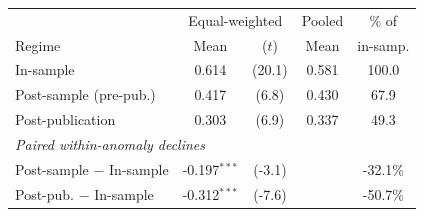 \begin{tabular}{lcccc}
\toprule
 & \multicolumn{2}{c}{Equal-weighted} & Pooled & \% of \\
Regime & Mean & ($t$) & Mean & in-samp. \\
\midrule
In-sample & 0.614 & (20.1) & 0.581 & 100.0 \\
Post-sample (pre-pub.) & 0.417 & (6.8) & 0.430 & 67.9 \\
Post-publication & 0.303 & (6.9) & 0.337 & 49.3 \\
\midrule
\multicolumn{5}{l}{\textit{Paired within-anomaly declines}}\\
Post-sample $-$ In-sample & -0.197$^{***}$ & (-3.1) & & -32.1\% \\
Post-pub. $-$ In-sample & -0.312$^{***}$ & (-7.6) & & -50.7\% \\
\bottomrule
\end{tabular}